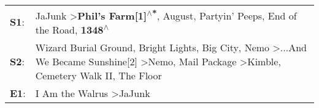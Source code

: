 \begin{supertabular}{p{0.03\textwidth}p{0.92\textwidth}}
 \textbf{S1}:  &                                                                                                                                             JaJunk\textsuperscript{} \textgreater \enspace \textbf{Phil's Farm[1]\textsuperscript{$\wedge$*}}, \enspace August\textsuperscript{}, \enspace Partyin' Peeps\textsuperscript{}, \enspace End of the Road\textsuperscript{}, \enspace \textbf{1348\textsuperscript{$\wedge$}}  \enspace  \\
 \textbf{S2}:  &  Wizard Burial Ground\textsuperscript{}, \enspace Bright Lights, Big City\textsuperscript{}, \enspace Nemo\textsuperscript{} \textgreater \enspace ...And We Became Sunshine[2]\textsuperscript{} \textgreater \enspace Nemo\textsuperscript{}, \enspace Mail Package\textsuperscript{} \textgreater \enspace Kimble\textsuperscript{}, \enspace Cemetery Walk II\textsuperscript{}, \enspace The Floor\textsuperscript{}  \enspace  \\
 \textbf{E1}:  &                                                                                                                                                                                                                                                                                                                                          I Am the Walrus\textsuperscript{} \textgreater \enspace JaJunk\textsuperscript{}  \enspace  \\
\end{supertabular}
